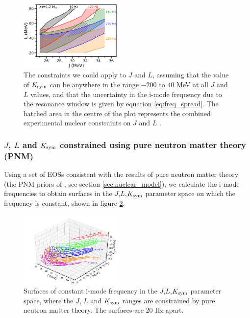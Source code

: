 \documentclass[fleqn,usenatbib]{mnras}
\begin{document}
\begin{figure}
\centering
\includegraphics[width=0.45\textwidth,angle=0]{grid_JL_Kdfspread_2.png}
\caption{The constraints we could apply to $J$ and $L$, assuming that the value of $K_{\rm sym}$ can be anywhere in the range $-200$ to $40$ MeV at all $J$ and $L$ values, and that the uncertainty in the i-mode frequency due to the resonance window is given by equation \ref{eq:freq_spread}. The hatched area in the centre of the plot represents the combined experimental nuclear constraints on $J$ and $L$ \citep{lattimer2013constraining}.}
\label{fig:all_constraints}
\end{figure}









\subsubsection{$J$, $L$ and $K_{\rm sym}$ constrained using pure neutron matter theory (PNM) } \label{subsec4_1_2}

\noindent Using a set of EOSs consistent with the results of pure neutron matter theory (the PNM priors of \citet{newton2020nuclear}, see section \ref{sec:nuclear_model}), we calculate the i-mode frequencies to obtain surfaces in the $J$,$L$,$K_{\rm sym}$ parameter space on which the frequency is constant, shown in figure \ref{fig:PNM_planes}. 

\begin{figure}
\centering
\includegraphics[width=0.45\textwidth,angle=0]{PNM_planes}
\caption{Surfaces of constant i-mode frequency in the $J$,$L$,$K_{\rm sym}$ parameter space, where the $J$, $L$ and $K_{\rm sym}$ ranges are constrained by pure neutron matter theory. The surfaces are 20 Hz apart.}
\label{fig:PNM_planes}
\end{figure}
\end{document}

